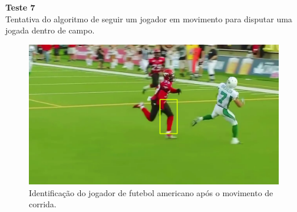 \textbf{Teste 7}\\
Tentativa do algoritmo de seguir um jogador em movimento para disputar uma jogada dentro de campo.

\begin{figure}
    \centering
    \caption{Identificação do jogador de futebol americano após o movimento de corrida.}
    \includegraphics[scale=0.2]{05-SLIDES_DESENVOLVIMENTO/Etapa_de_Testes/imagens_testes/jogador_dentro_de_campo_1.png}
\end{figure}